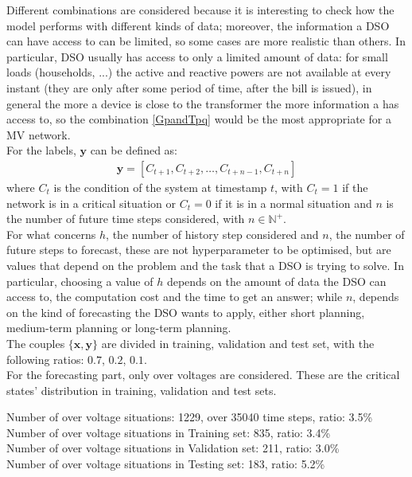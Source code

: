 \noindent Different combinations are considered because it is interesting to check how the model performs with different kinds of data; moreover, the information a \gls{DSO} can have access to can be limited, so some cases are more realistic than others. In particular, \gls{DSO} usually has access to only a limited amount of data: for small loads (households, ...) the active and reactive powers are not available at every instant (they are only after some period of time, after the bill is issued), in general the more a device is close to the transformer the more information a  has access to, so the combination \ref{GpandTpq} would be the most appropriate for a MV network.\\


\noindent For the labels, $\textbf{y}$ can be defined as: 
\begin{equation} \label{eq:labels}
    \begin{aligned}
        \textbf{y} = [C_{t+1},C_{t+2}, \dots, C_{t+n-1},C_{t+n}]
    \end{aligned}
\end{equation}
\noindent where $C_t$ is the condition of the system at timestamp $t$, with $C_t=1$ if the network is in a critical situation or $C_t=0$ if it is in a normal situation and $n$ is the number of future time steps considered, with $n \in \mathbb{N}^+$. \\

For what concerns $h$, the number of history step considered and $n$, the number of future steps to forecast, these are not hyperparameter to be optimised, but are values that depend on the problem and the task that a \gls{DSO} is trying to solve. In particular, choosing a value of $h$ depends on the amount of data the \gls{DSO} can access to, the computation cost and the time to get an answer; while $n$, depends on the kind of forecasting the \gls{DSO} wants to apply, either short planning, medium-term planning or long-term planning.\\

The couples $\{\textbf{x},\textbf{y}\}$ are divided in training, validation and test set, with the following ratios: $0.7$, $0.2$, $0.1$.\\
For the forecasting part, only over voltages are considered. These are the critical states' distribution in training, validation and test sets.
\begin{algorithm}[H]
    \State Number of over voltage situations: 1229, over 35040 time steps, ratio: 3.5\% \\
    
    \State Number of over voltage situations in Training set: 835, ratio: 3.4\%\\
    \State Number of over voltage situations in Validation set: 211, ratio: 3.0\%\\
    \State Number of over voltage situations in Testing set: 183, ratio: 5.2\%
\end{algorithm}

